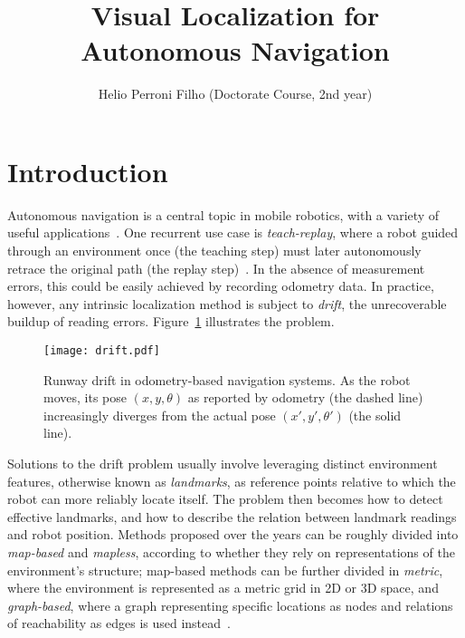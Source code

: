 \documentclass[twocolumn, 9pt,fleqn]{jsproceedings}
\title{Visual Localization for Autonomous Navigation}
\author{Helio Perroni Filho (Doctorate Course, 2nd year)\authorrefmark{1}}
\affiliation{Intelligent Robotics Laboratory, OHYA's group}
\begin{document}
\thispagestyle{myheadings}
\maketitle


\section{Introduction}

Autonomous navigation is a central topic in mobile robotics, with a variety of useful applications~\cite{BON02,ARK90}. One recurrent use case is \textit{teach-replay}, where a robot guided through an environment once (the teaching step) must later autonomously retrace the original path (the replay step)~\cite{BUR01}. In the absence of measurement errors, this could be easily achieved by recording odometry data. In practice, however, any intrinsic localization method is subject to \textit{drift}, the unrecoverable buildup of reading errors. Figure~\ref{fig:drift} illustrates the problem.

\begin{figure}[h!]
\vspace{20pt}
\texttt{[image: drift.pdf]}
\vspace{10pt}
\caption{Runway drift in odometry-based navigation systems. As the robot moves, its pose $(x, y, \theta)$ as reported by odometry (the dashed line) increasingly diverges from the actual pose $(x', y', \theta')$ (the solid line).}
\label{fig:drift}
\end{figure}

Solutions to the drift problem usually involve leveraging distinct environment features, otherwise known as \textit{landmarks}, as reference points relative to which the robot can more reliably locate itself. The problem then becomes how to detect effective landmarks, and how to describe the relation between landmark readings and robot position. Methods proposed over the years can be roughly divided into \textit{map-based} and \textit{mapless}, according to whether they rely on representations of the environment's structure; map-based methods can be further divided in \textit{metric}, where the environment is represented as a metric grid in 2D or 3D space, and \textit{graph-based}, where a graph representing specific locations as nodes and relations of reachability as edges is used instead~\cite{BON02}.
\end{document}
